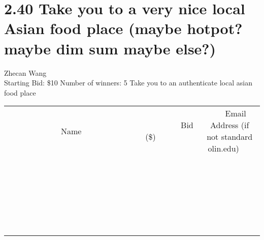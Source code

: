 \documentclass[11pt]{article}
\begin{document}
\section*{2.40 Take you to a very nice local Asian food place (maybe hotpot? maybe dim sum maybe else?)}
Zhecan Wang
\\
Starting Bid: \$10
\newline
Number of winners: 5
\newline
Take you to an authenticate local asian food place
\\[6ex]
\begin{tabular}{c c c}
~~~~~~~~~~~~~Name~~~~~~~~~~~~~ & ~~~~~~~~~Bid (\$)~~~~~~~~~  & ~~~Email Address (if not standard olin.edu)~~~\\
 & & \\
\hline
 & & \\
\hline
 & & \\
\hline
 & & \\
\hline
 & & \\
\hline
 & & \\
\hline
 & & \\
\hline
 & & \\
\hline
 & & \\
\hline
 & & \\
\hline
 & & \\
\hline
 & & \\
\hline
 & & \\
\hline
 & & \\
\hline
 & & \\
\hline
 & & \\
\hline
 & & \\
\hline
 & & \\
\hline
 & & \\
\hline
 & & \\
\hline
 & & \\
\hline
 & & \\
\hline
 & & \\
\hline
 & & \\
\hline
 & & \\
\hline
 & & \\
\hline
\end{tabular}
\newpage
\end{document}
